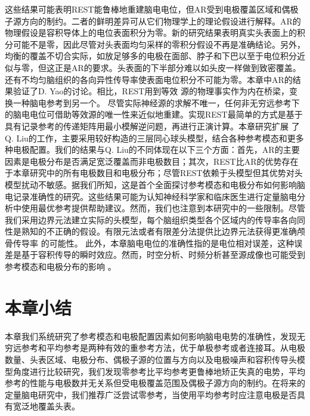 这些结果可能表明REST能鲁棒地重建脑电电位，但AR受到电极覆盖区域和偶极子源方向的制约。二者的鲜明差异可从它们物理学上的理论假设进行解释。AR的物理假设是容积导体上的电位表面积分为零。新的研究结果表明真实头表面上的积分可能不是零，因此尽管对头表面均匀采样的零积分假设不再是准确结论。另外，均衡的覆盖不切合实际，如放足够多的电极在面部、脖子和下巴以至于电位积分近似与零，但这正是AR的要求。头表面的下半部分难以如头皮一样做到致密覆盖。还有不均匀脑组织的各向异性传导率使表面电位积分不可能为零。本章中AR的结果验证了D. Yao的讨论。相比，REST用到等效
源的物理事实作为内在桥梁，变换一种脑电参考到另一个。 尽管实际神经源的求解不唯一，任何非无穷远参考下的脑电电位可借助等效源的唯一性来近似地重建。实现REST最简单的方式是基于具有记录参考的传递矩阵用最小模解逆问题，再进行正演计算。本章研究扩展
了Q. Liu的工作，主要采用较好构造的三层同心球头模型，结合各种参考模态和更多种电极配置。我们的结果与Q. Liu的不同体现在以下三个方面：首先，AR的主要因素是电极分布是否满足宽泛覆盖而非电极数目；其次，REST比AR的优势存在于本章研究中的所有电极数目和电极分布；尽管REST依赖于头模型但其优势对头模型扰动不敏感。据我们所知，这是首个全面探讨参考模态和电极分布如何影响脑电记录准确性的研究。这些结果可能为认知神经科学家和临床医生进行定量脑电分析中使用最优参考提供帮助建议。然而，我们也注意到本研究中的一些限制。尽管我们采用边界元法建立实际的头模型，每个脑组织类型各个区域内的传导率各向同性是熟知的不正确的假设。有限元法或者有限差分法提供比边界元法获得更准确颅骨传导率
的可能性。 此外，本章脑电电位的准确性指的是电位相对误差，这种误差是基于容积传导的瞬时效应。然而，时空分析、时频分析甚至源成像也可能受到参考模态和电极分布的影响 。
\section{本章小结}
本章我们系统研究了参考模态和电极配置因素如何影响脑电电势的准确性，发现无穷远参考和平均参考是两种有效的重参考方法，优于单极参考或者连接耳。从电极数量、头表区域、电极分布、偶极子源的位置与方向以及电极噪声和容积传导头模型角度进行比较研究，我们发现零参考比平均参考更鲁棒地矫正失真的电势，平均参考的性能与电极数并无关系但受电极覆盖范围及偶极子源方向的制约。在将来的定量脑电研究中，我们推荐广泛尝试零参考，当使用平均参考时应注意电极是否具有宽泛地覆盖头表。